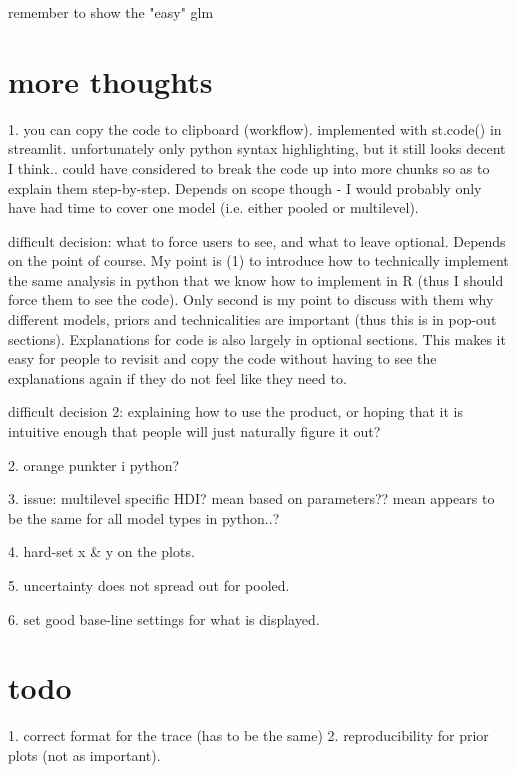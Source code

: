 \documentclass[12pt]{article}
\begin{document}
remember to show the "easy" glm


\section{more thoughts}

1. you can copy the code to clipboard (workflow).
implemented with st.code() in streamlit.
unfortunately only python syntax highlighting,
but it still looks decent I think..
could have considered to break the code up
into more chunks so as to explain them step-by-step.
Depends on scope though - I would probably only have
had time to cover one model (i.e. either pooled or multilevel).

difficult decision:
what to force users to see, and what to
leave optional. Depends on the point of course.
My point is (1) to introduce how to technically
implement the same analysis in python that we
know how to implement in R (thus I should force
them to see the code). Only second is my point
to discuss with them why different models, priors
and technicalities are important (thus this is
in pop-out sections). Explanations for code is
also largely in optional sections. This makes it
easy for people to revisit and copy the code
without having to see the explanations again
if they do not feel like they need to.

difficult decision 2:
explaining how to use the product,
or hoping that it is intuitive enough that
people will just naturally figure it out?

2. orange punkter i python?

3. issue: multilevel specific HDI?
mean based on parameters??
mean appears to be the same for all model
types in python..?

4. hard-set x \& y on the plots.

5. uncertainty does not spread out for pooled.

6. set good base-line settings for what is
displayed.

\section{todo}

1. correct format for the trace (has to be the same)
2. reproducibility for prior plots (not as important).

\printbibliography
\end{document}
